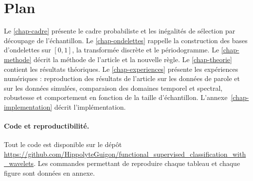 \section{Plan}

Le \cref{chap-cadre} présente le cadre probabiliste et les inégalités de sélection par découpage de l'échantillon. Le \cref{chap-ondelettes} rappelle la construction des bases d'ondelettes sur $[0,1]$, la transformée discrète et le périodogramme. Le \cref{chap-methode} décrit la méthode de l'article et la nouvelle règle. Le \cref{chap-theorie} contient les résultats théoriques. Le \cref{chap-experiences} présente les expériences numériques : reproduction des résultats de l'article sur les données de parole et sur les données simulées, comparaison des domaines temporel et spectral, robustesse et comportement en fonction de la taille d'échantillon. L'annexe~\ref{chap-implementation} décrit l'implémentation.

\paragraph{Code et reproductibilité.} Tout le code est disponible sur le dépôt \url{https://github.com/HippolyteGuigon/functional_supervised_classification_with_wavelets}. Les commandes permettant de reproduire chaque tableau et chaque figure sont données en annexe.
